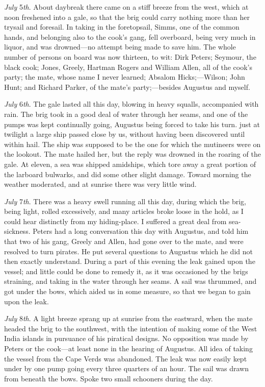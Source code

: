\emph{July} 5\emph{th}. About daybreak there came on a stiff breeze from the
west, which at noon freshened into a gale, so that the brig could carry nothing
more than her trysail and foresail. In taking in the foretopsail, Simms, one of
the common hands, and belonging also to the cook's gang, fell overboard, being
very much in liquor, and was drowned---no attempt being made to save him. The
whole number of persons on board was now thirteen, to wit: Dirk Peters; Seymour,
the black cook; Jones, Greely, Hartman Rogers and William Allen, all of the
cook's party; the mate, whose name I never learned; Absalom Hicks;---Wilson;
John Hunt; and Richard Parker, of the mate's party;---besides Augustus and
myself. 

\emph{July} 6\emph{th}. The gale lasted all this day, blowing in heavy
squalls, accompanied with rain. The brig took in a good deal of water through
her seams, and one of the pumps was kept continually going, Augustus being
forced to take his turn. just at twilight a large ship passed close by us,
without having been discovered until within hail. The ship was supposed to be
the one for which the mutineers were on the lookout. The mate hailed her, but
the reply was drowned in the roaring of the gale. At eleven, a sea was shipped
amidships, which tore away a great portion of the larboard bulwarks, and did
some other slight damage. Toward morning the weather moderated, and at sunrise
there was very little wind. 

\emph{July} 7\emph{th}. There was a heavy swell running all this day, during
which the brig, being light, rolled excessively, and many articles broke loose
in the hold, as I could hear distinctly from my hiding-place. I suffered a great
deal from sea-sickness. Peters had a long conversation this day with Augustus,
and told him that two of his gang, Greely and Allen, had gone over to the mate,
and were resolved to turn pirates. He put several questions to Augustus which he
did not then exactly understand. During a part of this evening the leak gained
upon the vessel; and little could be done to remedy it, as it was occasioned by
the brigs straining, and taking in the water through her seams. A sail was
thrummed, and got under the bows, which aided us in some measure, so that we
began to gain upon the leak. 

\emph{July} 8\emph{th}. A light breeze sprang up at sunrise from the
eastward, when the mate headed the brig to the southwest, with the intention of
making some of the West India islands in pursuance of his piratical designs. No
opposition was made by Peters or the cook---at least none in the hearing of
Augustus. All idea of taking the vessel from the Cape Verds was abandoned. The
leak was now easily kept under by one pump going every three quarters of an
hour. The sail was drawn from beneath the bows. Spoke two small schooners during
the day. 


